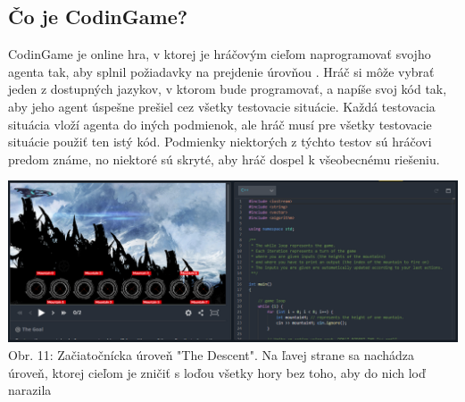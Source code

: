 \documentclass[slovak,a4paper,11pt]{article}
\begin{document}
\subsection{Čo je CodinGame?}
CodinGame je online hra, v ktorej je hráčovým cieľom naprogramovať svojho agenta tak, aby splnil požiadavky na prejdenie úrovňou \cite{combefis2016learning}. Hráč si môže vybrať jeden z dostupných jazykov, v ktorom bude programovať, a napíše svoj kód tak, aby jeho agent úspešne prešiel cez všetky testovacie situácie. Každá testovacia situácia vloží agenta do iných podmienok, ale hráč musí pre všetky testovacie situácie použiť ten istý kód. Podmienky niektorých z týchto testov sú hráčovi predom známe, no niektoré sú skryté, aby hráč dospel k všeobecnému riešeniu.\\
\begin{center}
\includegraphics[scale=0.28]{codingamemain}
\\ Obr. 11: Začiatočnícka úroveň "The Descent". Na ľavej strane sa nachádza úroveň, ktorej cieľom je zničiť s loďou všetky hory bez toho, aby do nich loď narazila
\end{center}
\end{document}
